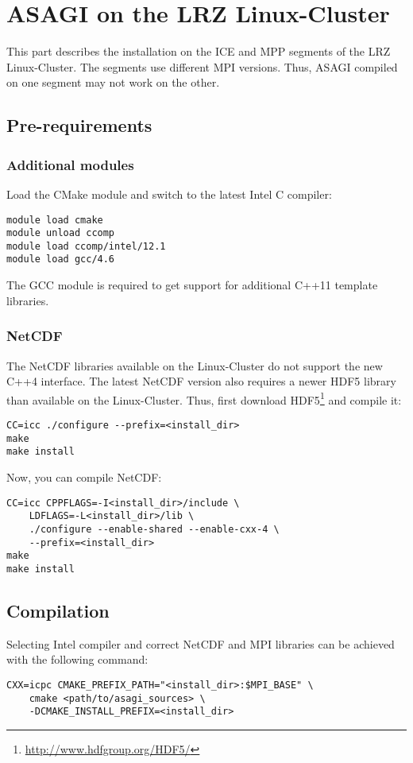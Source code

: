 \section{ASAGI on the LRZ Linux-Cluster}

This part describes the installation on the ICE and MPP segments of the LRZ Linux-Cluster. The segments use different MPI versions. Thus, ASAGI compiled on one segment may not work on the other.

\subsection{Pre-requirements}

\subsubsection{Additional modules}

Load the CMake module and switch to the latest Intel C compiler:
\lstset{language=bash}
\begin{lstlisting}
module load cmake
module unload ccomp
module load ccomp/intel/12.1
module load gcc/4.6
\end{lstlisting}

The GCC module is required to get support for additional C++11 template libraries.

\subsubsection{NetCDF}

The NetCDF libraries available on the Linux-Cluster do not support the new C++4 interface. The latest NetCDF version also requires a newer HDF5 library than available on the Linux-Cluster. Thus, first download HDF5\footnote{\url{http://www.hdfgroup.org/HDF5/}} and compile it:

\lstset{language=bash}
\begin{lstlisting}
CC=icc ./configure --prefix=<install_dir>
make
make install
\end{lstlisting}

Now, you can compile NetCDF:
\lstset{language=bash}
\begin{lstlisting}
CC=icc CPPFLAGS=-I<install_dir>/include \
    LDFLAGS=-L<install_dir>/lib \
    ./configure --enable-shared --enable-cxx-4 \
    --prefix=<install_dir>
make
make install
\end{lstlisting}

\subsection{Compilation}

Selecting Intel compiler and correct NetCDF and MPI libraries can be achieved with the following command:
\lstset{language=bash}
\begin{lstlisting}
CXX=icpc CMAKE_PREFIX_PATH="<install_dir>:$MPI_BASE" \
    cmake <path/to/asagi_sources> \
    -DCMAKE_INSTALL_PREFIX=<install_dir>
\end{lstlisting}
